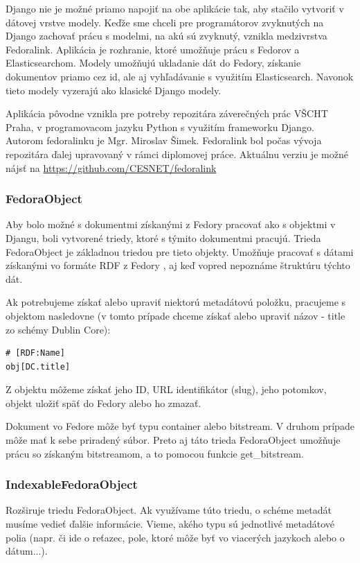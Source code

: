 \documentclass[thesis=M,slovak]{FITthesis}[2013/05/06]
\begin{document}
Django nie je možné priamo napojiť na obe aplikácie tak, aby stačilo vytvoriť v dátovej vrstve modely. Keďže sme chceli pre programátorov zvyknutých na Django zachovať prácu s modelmi, na akú sú zvyknutý, vznikla medzivrstva Fedoralink. Aplikácia je rozhranie, ktoré umožňuje prácu s Fedorov a Elasticsearchom. Modely umožňujú ukladanie dát do Fedory, získanie dokumentov priamo cez id, ale aj vyhľadávanie s využitím Elasticsearch. Navonok tieto modely vyzerajú ako klasické Django modely.

Aplikácia pôvodne vznikla pre potreby repozitára záverečných prác VŠCHT Praha, v programovacom jazyku Python s využitím frameworku Django. Autorom fedoralinku je Mgr. Miroslav Šimek. Fedoralink bol počas vývoja repozitára ďalej upravovaný v rámci diplomovej práce. Aktuálnu verziu je možné nájsť na \url{https://github.com/CESNET/fedoralink}

\subsubsection{FedoraObject}
Aby bolo možné s dokumentmi získanými z Fedory pracovať ako s objektmi v Djangu, boli vytvorené triedy, ktoré s týmito dokumentmi pracujú. Trieda FedoraObject je základnou triedou pre tieto objekty. Umožňuje pracovať s dátami získanými vo formáte RDF z Fedory , aj keď vopred nepoznáme štruktúru týchto dát.

Ak potrebujeme získať alebo upraviť niektorú metadátovú položku, pracujeme s objektom nasledovne (v tomto prípade chceme získať alebo upraviť názov - title zo schémy Dublin Core): 
\begin{lstlisting}[frame=single] 
# [RDF:Name]
obj[DC.title]
\end{lstlisting}

Z objektu môžeme získať jeho ID, URL identifikátor (slug), jeho potomkov, objekt uložiť späť do Fedory alebo ho zmazať.

Dokument vo Fedore môže byť typu container alebo bitstream. V druhom prípade môže mať k sebe priradený súbor. Preto aj táto trieda FedoraObject umožňuje prácu so získaným bitstreamom, a to pomocou funkcie get\_bitstream.

\subsubsection{IndexableFedoraObject}
Rozširuje triedu FedoraObject. Ak využívame túto triedu, o schéme metadát musíme vedieť ďalšie informácie. Vieme, akého typu sú jednotlivé metadátové polia (napr. či ide o reťazec, pole, ktoré môže byť vo viacerých jazykoch alebo o dátum...).
\end{document}
